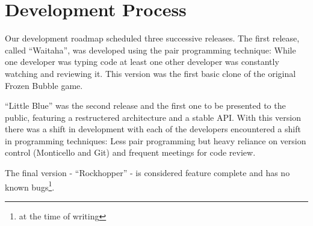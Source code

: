 \section{Development Process}
Our development roadmap scheduled three successive releases. The first release, called ``Waitaha'', was developed using the pair programming technique: While one developer was typing code at least one other developer was constantly watching and reviewing it. This version was the first basic clone of the original Frozen Bubble game.

``Little Blue'' was the second release and the first one to be presented to the public, featuring a restructered architecture and a stable API. With this version there was a shift in development with each of the developers encountered a shift in programming techniques: Less pair programming but heavy reliance on version control (Monticello and Git) and frequent meetings for code review.

The final version - ``Rockhopper'' - is considered feature complete and has no known bugs\footnote{at the time of writing}.